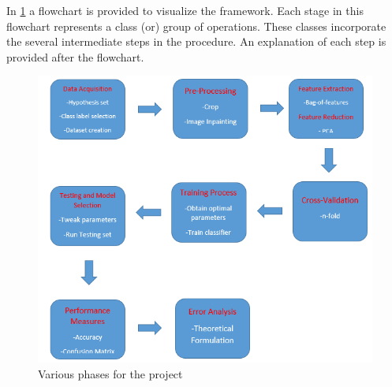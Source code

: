 \documentclass[letterpaper,12pt, onecolumn]{article}%
\begin{document}
In \cref{fig:methodology} a flowchart is provided to visualize the framework. Each stage in this flowchart represents a class (or) group of operations. These classes incorporate the several intermediate steps in the procedure. An explanation of each step is provided after the flowchart. 
\begin{figure}[!hbtp]
 	  \centering
 	   \includegraphics[scale=0.9] {fig_methodology.png} 
 	   \caption{Various phases for the project}
       \label{fig:methodology}
\end{figure}
\end{document}
